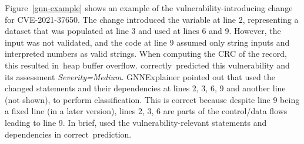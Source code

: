





\vspace{3pt}
 Figure~\ref{gnn-example} shows an example of
the vulnerability-introduc\-ing change for CVE-2021-37650. The change
introduced the variable  at line 2,
representing a dataset that was populated at line 3 and used at lines
6 and 9. However, the input was not validated, and the code at line 9
assumed only string inputs and interpreted numbers as valid strings.
When computing the CRC of the record, this resulted in~heap buffer
overflow. {\tool} correctly~predicted this vulnerability and its
assessment {\em Severity=Medium}. GNNExplainer pointed out that
{\tool} used the changed statements and their dependencies at lines 2,
3, 6, 9 and another line (not shown), to perform classification. This
is correct because despite line 9 being a fixed line (in a later
version), lines 2, 3, 6 are parts of the control/data flows leading to
line 9. In brief, {\tool} used the vulnerability-relevant statements
and dependencies in correct~prediction.







	
	

